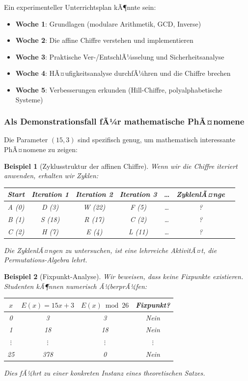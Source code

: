 ﻿\documentclass[12pt,a4paper]{article}
\newtheorem{example}{Beispiel}
\begin{document}
	Ein experimenteller Unterrichtsplan kÃ¶nnte sein:
	\begin{itemize}
		\item \textbf{Woche 1}: Grundlagen (modulare Arithmetik, GCD, Inverse)
		\item \textbf{Woche 2}: Die affine Chiffre verstehen und implementieren
		\item \textbf{Woche 3}: Praktische Ver-/EntschlÃ¼sselung und Sicherheitsanalyse
		\item \textbf{Woche 4}: HÃ¤ufigkeitsanalyse durchfÃ¼hren und die Chiffre brechen
		\item \textbf{Woche 5}: Verbesserungen erkunden (Hill-Chiffre, polyalphabetische Systeme)
	\end{itemize}
	
	\subsubsection{Als Demonstrationsfall fÃ¼r mathematische PhÃ¤nomene}
	
	Die Parameter $(15, 3)$ sind spezifisch genug, um mathematisch interessante PhÃ¤nomene zu zeigen:
	
	\begin{example}[Zyklusstruktur der affinen Chiffre]
		Wenn wir die Chiffre iteriert anwenden, erhalten wir Zyklen:
		
		\begin{center}
			\small
			\begin{tabular}{|c|c|c|c|c|c|c|}
				\hline
				Start & Iteration 1 & Iteration 2 & Iteration 3 & \ldots & ZyklenlÃ¤nge \\
				\hline
				A (0) & D (3) & W (22) & F (5) & \ldots & ? \\
				B (1) & S (18) & R (17) & C (2) & \ldots & ? \\
				C (2) & H (7) & E (4) & L (11) & \ldots & ? \\
				\hline
			\end{tabular}
		\end{center}
		
		Die ZyklenlÃ¤ngen zu untersuchen, ist eine lehrreiche AktivitÃ¤t, die Permutations-Algebra lehrt.
	\end{example}
	
	\begin{example}[Fixpunkt-Analyse]
		Wir beweisen, dass keine Fixpunkte existieren. Studenten kÃ¶nnen numerisch Ã¼berprÃ¼fen:
		\begin{center}
			\small
			\begin{tabular}{|c|c|c|c|}
				\hline
				$x$ & $E(x) = 15x + 3$ & $E(x) \bmod 26$ & Fixpunkt? \\
				\hline
				0 & 3 & 3 & Nein \\
				1 & 18 & 18 & Nein \\
				$\vdots$ & $\vdots$ & $\vdots$ & $\vdots$ \\
				25 & 378 & 0 & Nein \\
				\hline
			\end{tabular}
		\end{center}
		
		Dies fÃ¼hrt zu einer konkreten Instanz eines theoretischen Satzes.
	\end{example}
	
\end{document}
